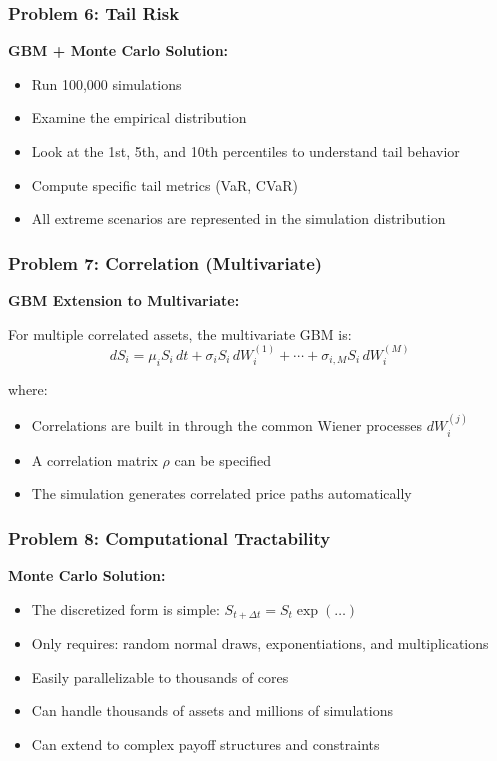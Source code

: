 \documentclass[12pt,a4paper]{article}
\begin{document}
\subsubsection{Problem 6: Tail Risk}

\textbf{GBM + Monte Carlo Solution:}
\begin{itemize}
    \item Run 100,000 simulations
    \item Examine the empirical distribution
    \item Look at the 1st, 5th, and 10th percentiles to understand tail behavior
    \item Compute specific tail metrics (VaR, CVaR)
    \item All extreme scenarios are represented in the simulation distribution
\end{itemize}

\subsubsection{Problem 7: Correlation (Multivariate)}

\textbf{GBM Extension to Multivariate:}

For multiple correlated assets, the multivariate GBM is:
\begin{equation}
dS_i = \mu_i S_i \, dt + \sigma_i S_i \, dW_i^{(1)} + \cdots + \sigma_{i,M} S_i \, dW_i^{(M)}
\end{equation}

where:
\begin{itemize}
    \item Correlations are built in through the common Wiener processes $dW_i^{(j)}$
    \item A correlation matrix $\rho$ can be specified
    \item The simulation generates correlated price paths automatically
\end{itemize}

\subsubsection{Problem 8: Computational Tractability}

\textbf{Monte Carlo Solution:}
\begin{itemize}
    \item The discretized form is simple: $S_{t+\Delta t} = S_t \exp(\ldots)$
    \item Only requires: random normal draws, exponentiations, and multiplications
    \item Easily parallelizable to thousands of cores
    \item Can handle thousands of assets and millions of simulations
    \item Can extend to complex payoff structures and constraints
\end{itemize}
\end{document}
